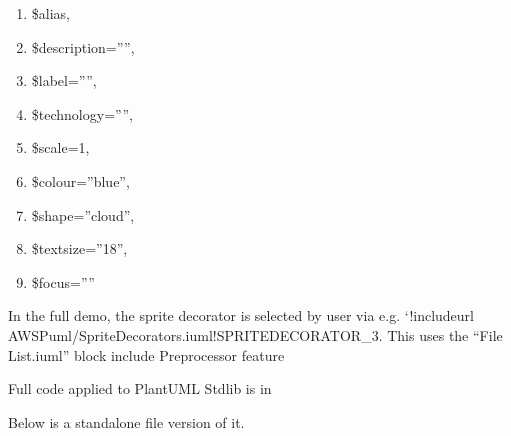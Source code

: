 \documentclass[letterpaper,10pt,english]{sphinxmanual}
\begin{document}
\begin{enumerate}
\begin{enumerate}
\item {} 
\$alias,

\item {} 
\$description=””,

\item {} 
\$label=””,

\item {} 
\$technology=””,

\item {} 
\$scale=1,

\item {} 
\$colour=”blue”,

\item {} 
\$shape=”cloud”,

\item {} 
\$textsize=”18”,

\item {} 
\$focus=””

\end{enumerate}

\end{enumerate}

In the full demo, the sprite decorator is selected by user via e.g. ‘!includeurl AWSPuml/SpriteDecorators.iuml!SPRITEDECORATOR\_3.
This uses the “File List.iuml” block include Preprocessor feature

\begin{figure}[htbp]
\centering
\capstart

\caption{}\label{\detokenize{Stdlib/StandardisingStdLib2:id4}}\end{figure}

Full code applied to PlantUML Stdlib is in

Below is a standalone file version of it.
\end{document}
